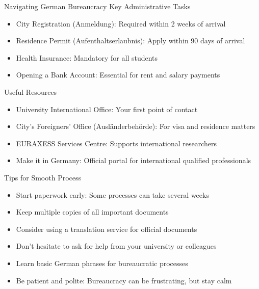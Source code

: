 \documentclass[aspectratio=169,10pt]{beamer}
\begin{document}
\begin{frame}{Navigating German Bureaucracy}
\alert{Key Administrative Tasks}
\begin{itemize}
    \item City Registration (Anmeldung): Required within 2 weeks of arrival
    \item Residence Permit (Aufenthaltserlaubnis): Apply within 90 days of arrival
    \item Health Insurance: Mandatory for all students
    \item Opening a Bank Account: Essential for rent and salary payments
\end{itemize}

\alert{Useful Resources}
\begin{itemize}
    \item University International Office: Your first point of contact
    \item City's Foreigners' Office (Ausländerbehörde): For visa and residence matters
    \item EURAXESS Services Centre: Supports international researchers
    \item Make it in Germany: Official portal for international qualified professionals
\end{itemize}

\alert{Tips for Smooth Process}
\begin{itemize}
    \item Start paperwork early: Some processes can take several weeks
    \item Keep multiple copies of all important documents
    \item Consider using a translation service for official documents
    \item Don't hesitate to ask for help from your university or colleagues
    \item Learn basic German phrases for bureaucratic processes
    \item Be patient and polite: Bureaucracy can be frustrating, but stay calm
\end{itemize}
\end{frame}
\end{document}
